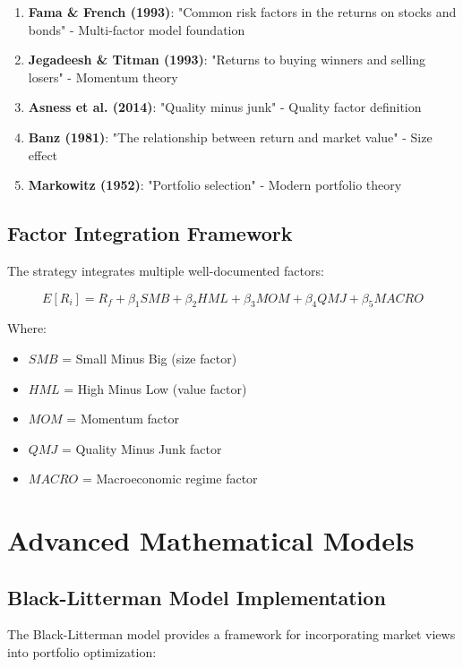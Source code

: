 \documentclass[12pt,a4paper]{article}
\begin{document}
\begin{enumerate}
    \item \textbf{Fama \& French (1993)}: "Common risk factors in the returns on stocks and bonds" - Multi-factor model foundation
    \item \textbf{Jegadeesh \& Titman (1993)}: "Returns to buying winners and selling losers" - Momentum theory
    \item \textbf{Asness et al. (2014)}: "Quality minus junk" - Quality factor definition
    \item \textbf{Banz (1981)}: "The relationship between return and market value" - Size effect
    \item \textbf{Markowitz (1952)}: "Portfolio selection" - Modern portfolio theory
\end{enumerate}

\subsection{Factor Integration Framework}

The strategy integrates multiple well-documented factors:

\begin{equation}
E[R_i] = R_f + \beta_1 SMB + \beta_2 HML + \beta_3 MOM + \beta_4 QMJ + \beta_5 MACRO
\end{equation}

Where:
\begin{itemize}
    \item $SMB$ = Small Minus Big (size factor)
    \item $HML$ = High Minus Low (value factor)  
    \item $MOM$ = Momentum factor
    \item $QMJ$ = Quality Minus Junk factor
    \item $MACRO$ = Macroeconomic regime factor
\end{itemize}

\section{Advanced Mathematical Models}

\subsection{Black-Litterman Model Implementation}

The Black-Litterman model provides a framework for incorporating market views into portfolio optimization:
\end{document}
